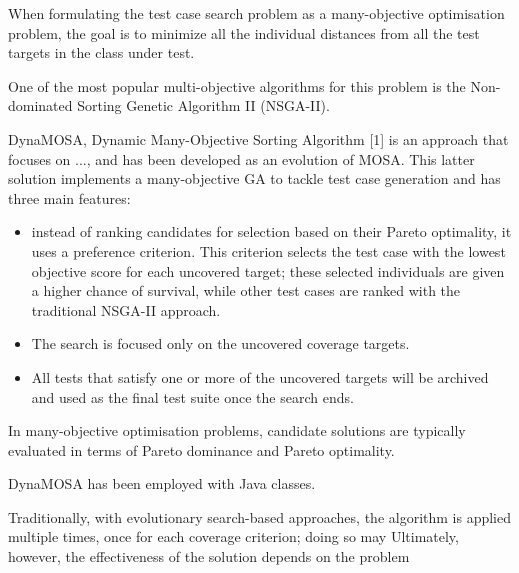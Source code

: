 When formulating the test case search problem as a many-objective optimisation problem, the goal is to minimize all the individual
distances from all the test targets in the class under test.


One of the most popular multi-objective algorithms for this problem is the Non-dominated Sorting Genetic Algorithm II (NSGA-II).



DynaMOSA, Dynamic Many-Objective Sorting Algorithm [1] is an approach that focuses on ..., and has been developed as an evolution 
of MOSA. This latter solution implements a many-objective GA to tackle test case generation and has three main features: 
\begin{itemize}
    \item instead of ranking candidates for selection based on their Pareto optimality, it uses a preference criterion.
        This criterion selects the test case with the lowest objective score for each uncovered target; these selected individuals
        are given a higher chance of survival, while other test cases are ranked with the traditional NSGA-II approach.
    \item The search is focused only on the uncovered coverage targets.
    \item All tests that satisfy one or more of the uncovered targets will be archived and used as the final test suite once the search ends.
\end{itemize}

In many-objective optimisation problems, candidate solutions are typically evaluated in terms of Pareto dominance and Pareto optimality.


DynaMOSA has been employed with Java classes.

Traditionally, with evolutionary search-based approaches, the algorithm is applied multiple times, 
once for each coverage criterion; doing so may 
Ultimately, however, the effectiveness of the solution depends on the problem